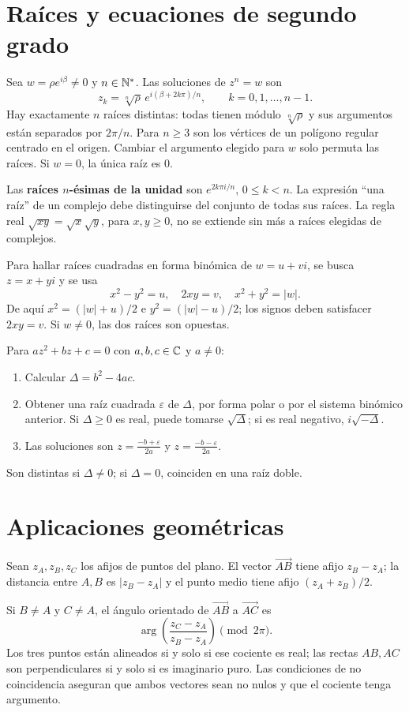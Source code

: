 \section{Raíces y ecuaciones de segundo grado}
\label{sec:raices-complejas}
Sea $w=\rho e^{i\beta}\ne0$ y $n\in\mathbb{N}^*$. Las soluciones de $z^n=w$ son
\[
 z_k=\sqrt[n]{\rho}\,
 e^{i(\beta+2k\pi)/n},\qquad k=0,1,\ldots,n-1.
\]
Hay exactamente $n$ raíces distintas: todas tienen módulo
$\sqrt[n]\rho$ y sus argumentos están separados por $2\pi/n$.
Para $n\ge3$ son los vértices de un polígono regular centrado en el
origen. Cambiar el argumento elegido para $w$ solo permuta las raíces.
Si $w=0$, la única raíz es $0$.

Las \textbf{raíces $n$-ésimas de la unidad} son
$e^{2k\pi i/n}$, $0\le k<n$.
La expresión ``una raíz'' de un complejo debe distinguirse del conjunto
de todas sus raíces. La regla real $\sqrt{xy}=\sqrt x\sqrt y$, para
$x,y\ge0$, no se extiende sin más a raíces elegidas de complejos.

Para hallar raíces cuadradas en forma binómica de $w=u+vi$, se busca
$z=x+yi$ y se usa
\[
 x^2-y^2=u,\quad 2xy=v,\quad x^2+y^2=|w|.
\]
De aquí $x^2=(|w|+u)/2$ e $y^2=(|w|-u)/2$; los signos deben satisfacer
$2xy=v$. Si $w\ne0$, las dos raíces son opuestas.

Para $az^2+bz+c=0$ con $a,b,c\in\mathbb{C}$ y $a\ne0$:
\begin{enumerate}
\item Calcular $\Delta=b^2-4ac$.
\item Obtener una raíz cuadrada $\varepsilon$ de $\Delta$, por forma polar
o por el sistema binómico anterior. Si $\Delta\ge0$ es real, puede
tomarse $\sqrt\Delta$; si es real negativo, $i\sqrt{-\Delta}$.
\item Las soluciones son
$\displaystyle z=\frac{-b+\varepsilon}{2a}$ y
$\displaystyle z=\frac{-b-\varepsilon}{2a}$.
\end{enumerate}
Son distintas si $\Delta\ne0$; si $\Delta=0$, coinciden en una raíz doble.

\section{Aplicaciones geométricas}
\label{sec:geometria-compleja}
Sean $z_A,z_B,z_C$ los afijos de puntos del plano.
El vector $\overrightarrow{AB}$ tiene afijo $z_B-z_A$; la distancia
entre $A,B$ es $|z_B-z_A|$ y el punto medio tiene afijo
$(z_A+z_B)/2$.

Si $B\ne A$ y $C\ne A$, el ángulo orientado de
$\overrightarrow{AB}$ a $\overrightarrow{AC}$ es
\[
 \arg\left(\frac{z_C-z_A}{z_B-z_A}\right)\pmod{2\pi}.
\]
Los tres puntos están alineados si y solo si ese cociente es real;
las rectas $AB,AC$ son perpendiculares si y solo si es imaginario puro.
Las condiciones de no coincidencia aseguran que ambos vectores sean
no nulos y que el cociente tenga argumento.


